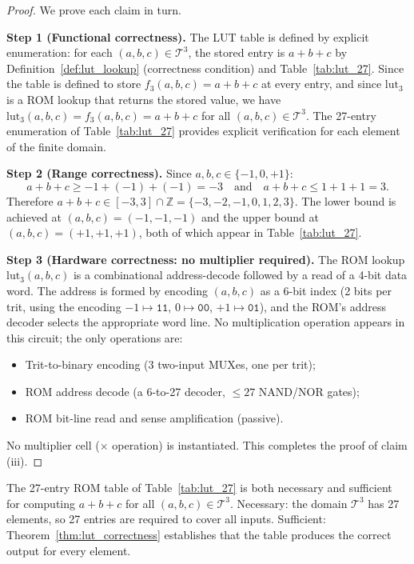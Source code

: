 \begin{proof}
We prove each claim in turn.

\medskip
\noindent\textbf{Step 1 (Functional correctness).}
The LUT table is defined by explicit enumeration: for each
$(a,b,c) \in \mathcal{T}^3$, the stored entry is $a + b + c$ by
Definition~\ref{def:lut_lookup} (correctness condition) and Table~\ref{tab:lut_27}.
Since the table is defined to store $f_3(a,b,c) = a+b+c$ at every entry,
and since $\mathrm{lut}_3$ is a ROM lookup that returns the stored value,
we have $\mathrm{lut}_3(a,b,c) = f_3(a,b,c) = a+b+c$ for all $(a,b,c) \in
\mathcal{T}^3$.  The 27-entry enumeration of Table~\ref{tab:lut_27} provides
explicit verification for each element of the finite domain.

\medskip
\noindent\textbf{Step 2 (Range correctness).}
Since $a, b, c \in \{-1, 0, +1\}$:
\[
  a + b + c \geq -1 + (-1) + (-1) = -3
  \quad\text{and}\quad
  a + b + c \leq 1 + 1 + 1 = 3.
\]
Therefore $a + b + c \in [-3, 3] \cap \mathbb{Z} = \{-3,-2,-1,0,1,2,3\}$.
The lower bound is achieved at $(a,b,c) = (-1,-1,-1)$ and the upper bound
at $(a,b,c) = (+1,+1,+1)$, both of which appear in Table~\ref{tab:lut_27}.

\medskip
\noindent\textbf{Step 3 (Hardware correctness: no multiplier required).}
The ROM lookup $\mathrm{lut}_3(a,b,c)$ is a combinational address-decode
followed by a read of a 4-bit data word.  The address is formed by encoding
$(a,b,c)$ as a 6-bit index (2 bits per trit, using the encoding $-1 \mapsto
\mathtt{11}$, $0 \mapsto \mathtt{00}$, $+1 \mapsto \mathtt{01}$), and
the ROM's address decoder selects the appropriate word line.  No multiplication
operation appears in this circuit; the only operations are:
\begin{itemize}
  \item Trit-to-binary encoding (3 two-input MUXes, one per trit);
  \item ROM address decode (a 6-to-27 decoder, $\leq 27$ NAND/NOR gates);
  \item ROM bit-line read and sense amplification (passive).
\end{itemize}
No multiplier cell ($\times$ operation) is instantiated.  This completes
the proof of claim (iii).
\end{proof}

\begin{corollary}
\label{cor:27_sufficiency}
The 27-entry ROM table of Table~\ref{tab:lut_27} is both necessary and
sufficient for computing $a+b+c$ for all $(a,b,c) \in \mathcal{T}^3$.
Necessary: the domain $\mathcal{T}^3$ has 27 elements, so 27 entries are
required to cover all inputs.  Sufficient: Theorem~\ref{thm:lut_correctness}
establishes that the table produces the correct output for every element.
\end{corollary}

